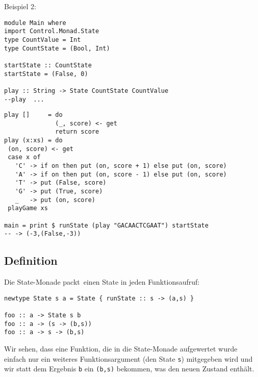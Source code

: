 \documentclass{beamer}
\begin{document}
\begin{frame}[fragile]
Beispiel 2:
\begin{verbatim}
module Main where
import Control.Monad.State
type CountValue = Int
type CountState = (Bool, Int)
 
startState :: CountState
startState = (False, 0)

play :: String -> State CountState CountValue
--play  ...

\end{verbatim}
\end{frame}

\begin{frame}[fragile]
\begin{verbatim}
play []     = do
              (_, score) <- get
              return score
play (x:xs) = do
 (on, score) <- get
 case x of
   'C' -> if on then put (on, score + 1) else put (on, score)
   'A' -> if on then put (on, score - 1) else put (on, score)
   'T' -> put (False, score)
   'G' -> put (True, score)
   _   -> put (on, score)
 playGame xs

main = print $ runState (play "GACAACTCGAAT") startState
-- -> (-3,(False,-3))
\end{verbatim}
\end{frame}

\subsection{Definition}
\begin{frame}[fragile]
Die State-Monade \glqq packt\grqq \ einen State in jeden Funktionsaufruf:
\begin{verbatim}
newtype State s a = State { runState :: s -> (a,s) }

foo :: a -> State s b
foo :: a -> (s -> (b,s))
foo :: a -> s -> (b,s)
\end{verbatim}
\pause
Wir sehen, dass eine Funktion, die in die State-Monade aufgewertet wurde einfach nur ein weiteres Funktionsargument (den State \texttt{s}) mitgegeben wird und wir statt dem Ergebnis \texttt{b} ein \texttt{(b,s)} bekommen, was den neuen Zustand enthält.
\end{frame}
\end{document}
